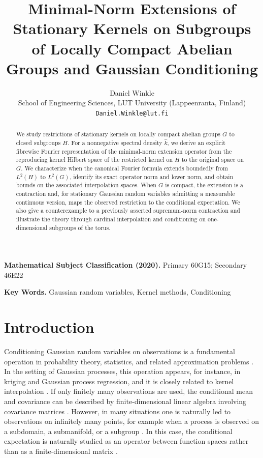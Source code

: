 \documentclass{article}
\title{Minimal-Norm Extensions of Stationary Kernels on Subgroups of Locally Compact Abelian Groups and Gaussian Conditioning}
\author{Daniel Winkle\\
School of Engineering Sciences, LUT University (Lappeenranta, Finland)\\
\texttt{\small Daniel.Winkle@lut.fi}\\
}
\begin{document}
\maketitle


\begin{abstract}
We study restrictions of stationary kernels on locally compact abelian groups $G$ to closed subgroups $H$. For a nonnegative spectral density $\hat k$, we derive an explicit fibrewise Fourier representation of the minimal-norm extension operator from the reproducing kernel Hilbert space of the restricted kernel on $H$ to the original space on $G$. We characterize when the canonical Fourier formula extends boundedly from $L^2(H)$ to $L^2(G)$, identify its exact operator norm and lower norm, and obtain bounds on the associated interpolation spaces. When $G$ is compact, the extension is a contraction and, for stationary Gaussian random variables admitting a measurable continuous version, maps the observed restriction to the conditional expectation. We also give a counterexample to a previously asserted supremum-norm contraction and illustrate the theory through cardinal interpolation and conditioning on one-dimensional subgroups of the torus.
\end{abstract}

\textbf{Mathematical Subject Classification (2020).} Primary 60G15; Secondary 46E22

\textbf{Key Words.} Gaussian random variables, Kernel methods, Conditioning


\section{Introduction}\label{sec:intro} 

Conditioning Gaussian random variables on observations is a fundamental operation in probability theory, statistics, and related approximation problems \cite{bogachev1998gaussian,steinwart2024conditioning}. In the setting of Gaussian processes, this operation appears, for instance, in kriging and Gaussian process regression, and it is closely related to kernel interpolation \cite{wenzel2026sharp,rasmussen2006gaussian,wendland2004scattered}. If only finitely many observations are used, the conditional mean and covariance can be described by finite-dimensional linear algebra involving covariance matrices \cite{rasmussen2006gaussian}. However, in many situations one is naturally led to observations on infinitely many points, for example when a process is observed on a subdomain, a submanifold, or a subgroup \cite{lagatta2013continuous,steinwart2024conditioning,fuselier2012scattered}. In this case, the conditional expectation is naturally studied as an operator between function spaces rather than as a finite-dimensional matrix \cite{lagatta2013continuous,owhadi2018conditioning,steinwart2024conditioning,travelletti2024disintegration}.
\end{document}
